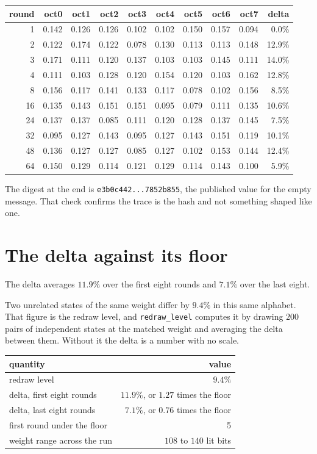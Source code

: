 \begin{center}
\begin{tabular}{@{}rrrrrrrrrr@{}}
\toprule
round & oct0 & oct1 & oct2 & oct3 & oct4 & oct5 & oct6 & oct7 & delta \\
\midrule
1 & 0.142 & 0.126 & 0.126 & 0.102 & 0.102 & 0.150 & 0.157 & 0.094 & 0.0\% \\
2 & 0.122 & 0.174 & 0.122 & 0.078 & 0.130 & 0.113 & 0.113 & 0.148 & 12.9\% \\
3 & 0.171 & 0.111 & 0.120 & 0.137 & 0.103 & 0.103 & 0.145 & 0.111 & 14.0\% \\
4 & 0.111 & 0.103 & 0.128 & 0.120 & 0.154 & 0.120 & 0.103 & 0.162 & 12.8\% \\
8 & 0.156 & 0.117 & 0.141 & 0.133 & 0.117 & 0.078 & 0.102 & 0.156 & 8.5\% \\
16 & 0.135 & 0.143 & 0.151 & 0.151 & 0.095 & 0.079 & 0.111 & 0.135 & 10.6\% \\
24 & 0.137 & 0.137 & 0.085 & 0.111 & 0.120 & 0.128 & 0.137 & 0.145 & 7.5\% \\
32 & 0.095 & 0.127 & 0.143 & 0.095 & 0.127 & 0.143 & 0.151 & 0.119 & 10.1\% \\
48 & 0.136 & 0.127 & 0.127 & 0.085 & 0.127 & 0.102 & 0.153 & 0.144 & 12.4\% \\
64 & 0.150 & 0.129 & 0.114 & 0.121 & 0.129 & 0.114 & 0.143 & 0.100 & 5.9\% \\
\bottomrule
\end{tabular}
\end{center}

The digest at the end is \texttt{e3b0c442...7852b855}, the published value for the empty message. That check confirms the trace is the hash and not something shaped like one.

\section{The delta against its floor}

The delta averages \(11.9\%\) over the first eight rounds and \(7.1\%\) over the last eight.

Two unrelated states of the same weight differ by \(9.4\%\) in this same alphabet. That figure is the redraw level, and \texttt{redraw\_level} computes it by drawing \(200\) pairs of independent states at the matched weight and averaging the delta between them. Without it the delta is a number with no scale.

\begin{center}
\begin{tabular}{@{}lr@{}}
\toprule
quantity & value \\
\midrule
redraw level & \(9.4\%\) \\
delta, first eight rounds & \(11.9\%\), or \(1.27\) times the floor \\
delta, last eight rounds & \(7.1\%\), or \(0.76\) times the floor \\
first round under the floor & 5 \\
weight range across the run & \(108\) to \(140\) lit bits \\
\bottomrule
\end{tabular}
\end{center}

